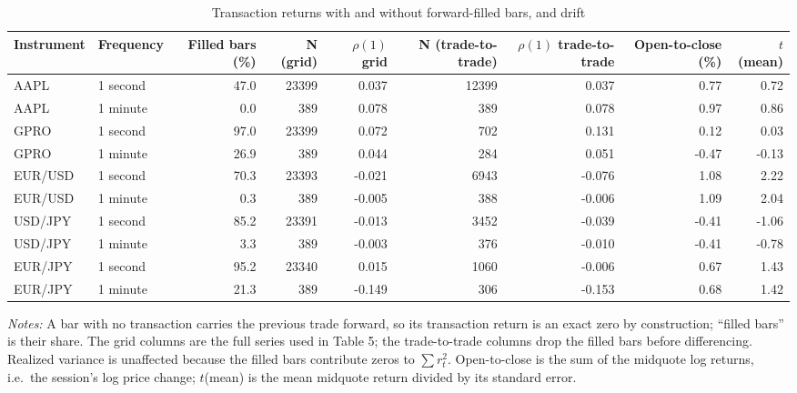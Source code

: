 \begin{table}[htbp]
\centering
\caption{Transaction returns with and without forward-filled bars, and drift}
\label{tab:stale_drift}
\footnotesize
\begin{tabular}{llrrrrrrr}
\toprule
Instrument & Frequency & Filled bars (\%) & N (grid) & $\rho(1)$ grid & N (trade-to-trade) & $\rho(1)$ trade-to-trade & Open-to-close (\%) & $t$(mean) \\
\midrule
AAPL & 1 second & 47.0 & 23399 & 0.037 & 12399 & 0.037 & 0.77 & 0.72 \\
AAPL & 1 minute & 0.0 & 389 & 0.078 & 389 & 0.078 & 0.97 & 0.86 \\
GPRO & 1 second & 97.0 & 23399 & 0.072 & 702 & 0.131 & 0.12 & 0.03 \\
GPRO & 1 minute & 26.9 & 389 & 0.044 & 284 & 0.051 & -0.47 & -0.13 \\
EUR/USD & 1 second & 70.3 & 23393 & -0.021 & 6943 & -0.076 & 1.08 & 2.22 \\
EUR/USD & 1 minute & 0.3 & 389 & -0.005 & 388 & -0.006 & 1.09 & 2.04 \\
USD/JPY & 1 second & 85.2 & 23391 & -0.013 & 3452 & -0.039 & -0.41 & -1.06 \\
USD/JPY & 1 minute & 3.3 & 389 & -0.003 & 376 & -0.010 & -0.41 & -0.78 \\
EUR/JPY & 1 second & 95.2 & 23340 & 0.015 & 1060 & -0.006 & 0.67 & 1.43 \\
EUR/JPY & 1 minute & 21.3 & 389 & -0.149 & 306 & -0.153 & 0.68 & 1.42 \\
\bottomrule
\end{tabular}

\begin{minipage}{0.95\linewidth}\footnotesize\emph{Notes:} A bar with no transaction carries the previous trade forward, so its transaction return is an exact zero by construction; ``filled bars'' is their share. The grid columns are the full series used in Table 5; the trade-to-trade columns drop the filled bars before differencing. Realized variance is unaffected because the filled bars contribute zeros to $\sum r_t^2$. Open-to-close is the sum of the midquote log returns, i.e.\ the session's log price change; $t$(mean) is the mean midquote return divided by its standard error.\end{minipage}
\end{table}

